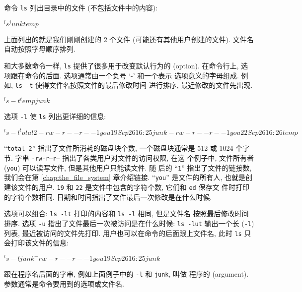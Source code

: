 命令 \texttt{ls} 列出目录中的文件 (不包括文件中的内容):
\begin{upeshell}
$ ^ls^
junk
temp
$
\end{upeshell}
上面列出的就是我们刚刚创建的 2 个文件 (可能还有其他用户创建的文件). 文件名
自动按照字母顺序排列.

和大多数命令一样, \texttt{ls} 提供了很多用于改变默认行为的 
(option). 在命令行上, 选项跟在命令的后面. 选项通常由一个负号 `-' 和一个表示
选项意义的字母组成. 例如, \texttt{ls -t} 使得文件名按照文件的最后修改时间
进行排序, 最近修改的文件先出现.
\begin{upeshell}
$ ^ls -t^
temp
junk
$
\end{upeshell}
选项 \texttt{-l} 使 \texttt{ls} 列出更详细的信息:
\begin{upeshell}
$ ^ls -l^
total 2
-rw-r--r-- 1 you	19 Sep 26 16:25 junk
-rw-r--r-- 1 you	22 Sep 26 16:26 temp
$
\end{upeshell}

``\texttt{total 2}'' 指出了文件所消耗的磁盘块个数, 一个磁盘块通常是 512 或
1024 个字节. 字串 \texttt{-rw-r--r--} 指出了各类用户对文件的访问权限, 在这
个例子中, 文件所有者 (\texttt{you}) 可以读写文件, 但是其他用户只能读文件. 随
后的 ``\texttt{1}'' 指出了文件的链接数, 我们会在第 \ref{chap:the_file_system}
章介绍链接. ``\texttt{you}'' 是文件的所有人, 也就是创建该文件的用户.
\texttt{19} 和 \texttt{22} 是文件中包含的字符个数, 它们和 \texttt{ed} 保存文
件时打印的字符个数相同. 日期和时间指出了文件最后一次修改是在什么时候.

选项可以组合: \texttt{ls -lt} 打印的内容和 \texttt{ls -l} 相同, 但是文件名
按照最后修改时间排序. 选项 \texttt{-u} 指出了文件最后一次被访问是在什么时候:
\texttt{ls -lut} 输出一个长 (\texttt{-l}) 列表, 最近被访问的文件先打印.
用户也可以在命令的后面跟上文件名, 此时 \texttt{ls} 只会打印该文件的信息:
\begin{upeshell}
$ ^ls -l junk^
-rw-r--r-- 1 you	19 Sep 26 16:25 junk
$
\end{upeshell}

跟在程序名后面的字串, 例如上面例子中的 \texttt{-l} 和 \texttt{junk}, 叫做
程序的  (argument). 参数通常是命令要用到的选项或文件名.
